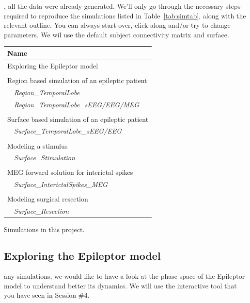 \documentclass{tufte-handout}
\begin{document}
, all the data were already generated. We'll only go through the necessary steps 
required to reproduce the simulations listed in Table~\ref{tab:simtab}, along with the relevant outline.
You can always start over, click along and/or try to change parameters.
We wil use the default subject connectivity matrix and surface.


\begin{margintable}
  \centering
  \selectfont
  \begin{tabular}{l}
    \toprule
    Name \\
    \midrule
    Exploring the Epileptor model\\
    \\
    Region based simulation of an epileptic patient \\
    $\quad$\textit{Region\_TemporalLobe} \\
    $\quad$\textit{Region\_TemporalLobe\_sEEG/EEG/MEG}  \\
    \\
    Surface based simulation of an epileptic patient \\
    $\quad$\textit{Surface\_TemporalLobe\_sEEG/EEG}  \\
    \\
    Modeling a stimulus \\
    $\quad$\textit{Surface\_Stimulation}  \\ 
    \\
    MEG forward solution for interictal spikes \\
    $\quad$\textit{Surface\_InterictalSpikes\_MEG} \\
    \\
    Modeling surgical resection\\
    $\quad$\textit{Surface\_Resection} \\
    \bottomrule
  \end{tabular}
  \caption{Simulations in this project.}
  \label{tab:simtab}
\end{margintable}


\subsection{Exploring the Epileptor model}\label{sec:epileptor}


 any simulations, we would like to have a look at the phase space of the Epileptor model
to understand better its dynamics. We will use the interactive tool that you have seen in Session \#4.
\end{document}
